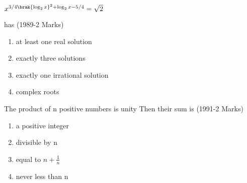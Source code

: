 $x^{3/4\brak{\log_{2} x}^{2}+\log_{2} x-5/4}=\sqrt{2}$

has \hfill (1989-2 Marks)
\begin{enumerate}
    \item at least one real solution
    \item exactly three solutions
    \item exactly one irrational solution
    \item complex roots
\end{enumerate}
\item The product of n positive numbers is unity Then their sum is \hfill (1991-2 Marks)
\begin{enumerate}
    \item a positive integer
    \item divisible by n
    \item equal to $n+\frac{1}{n}$
    \item never less than n
\end{enumerate}


